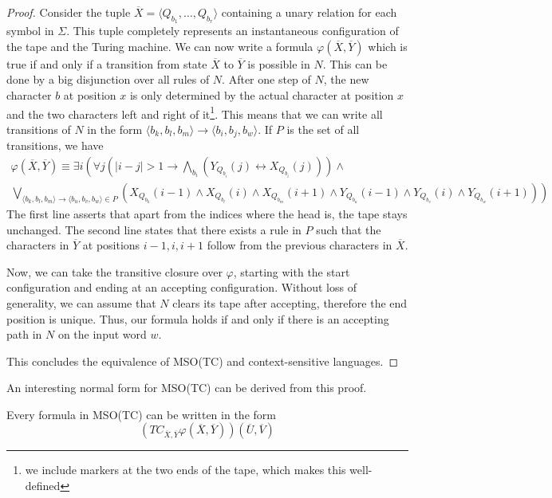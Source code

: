 \begin{proof}
    Consider the tuple $\overline{X} = \langle Q_{b_1}, \dots, Q_{b_r} \rangle$ containing a unary relation for each symbol in $\Sigma$.
    This tuple completely represents an instantaneous configuration of the tape and the Turing machine.
    We can now write a formula $\varphi(\overline{X}, \overline{Y})$ which is true if and only if a transition from state $\overline{X}$ to $\overline{Y}$ is possible in $N$.
    This can be done by a big disjunction over all rules of $N$.
    After one step of $N$, the new character $b$ at position $x$ is only determined by the actual character at position $x$ and the two characters left and right of it\footnote{we include markers at the two ends of the tape, which makes this well-defined}.
    This means that we can write all transitions of $N$ in the form $\langle b_{k},b_{l},b_{m}\rangle \to \langle b_{i}, b_{j}, b_{w} \rangle$.
    If $P$ is the set of all transitions, we have
    \begin{multline*}
        \varphi(\overline{X}, \overline{Y}) \equiv \exists i \left(\forall j \left(|i - j| > 1 \to \bigwedge_{b_i}\left(Y_{Q_{b_i}}(j) \leftrightarrow X_{Q_{b_i}}(j)\right)\right) \land \right. \\
        \left. \bigvee_{\langle b_{k},b_{l},b_{m}\rangle \to \langle b_{u}, b_{v}, b_{w} \rangle \in P} \left(X_{Q_{b_{k}}}(i - 1) \land X_{Q_{b_{l}}}(i) \land X_{Q_{b_{m}}}(i + 1) \land Y_{Q_{b_{u}}}(i - 1) \land Y_{Q_{b_{v}}}(i) \land Y_{Q_{b_{w}}}(i + 1) \right)\right)
    \end{multline*}
    The first line asserts that apart from the indices where the head is, the tape stays unchanged.
    The second line states that there exists a rule in $P$ such that the characters in $\overline{Y}$ at positions $i - 1, i, i + 1$ follow from the previous characters in $\overline{X}$.

    Now, we can take the transitive closure over $\varphi$, starting with the start configuration and ending at an accepting configuration.
    Without loss of generality, we can assume that $N$ clears its tape after accepting, therefore the end position is unique.
    Thus, our formula holds if and only if there is an accepting path in $N$ on the input word $w$.

    This concludes the equivalence of \acs{MSO}(\acs{TC}) and context-sensitive languages.
\end{proof}

An interesting normal form for \acs{MSO}(\acs{TC}) can be derived from this proof.
\begin{corollary}
    \label{cor:normalmso}
    Every formula in \acs{MSO}(\acs{TC}) can be written in the form
    \[
        \left( TC_{\overline{X}, \overline{Y}} \varphi(\overline{X}, \overline{Y}) \right)\left( \overline{U}, \overline{V} \right)
    \]
\end{corollary}

